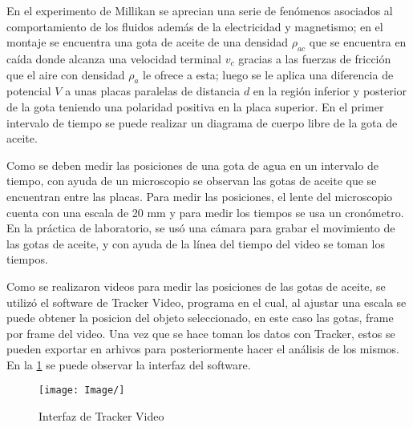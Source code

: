 En el experimento de Millikan se aprecian una serie de fenómenos asociados al 
comportamiento de los fluidos además de la electricidad y magnetismo; en el 
montaje se encuentra una gota de aceite de una densidad $\rho_{ac}$ que se 
encuentra en caída donde alcanza una velocidad terminal $v_c$ gracias a las 
fuerzas de fricción que el aire con densidad $\rho_a$ le ofrece a esta; luego 
se le aplica una diferencia de potencial $V$ a unas placas paralelas de 
distancia $d$ en la región inferior y posterior de la gota teniendo una 
polaridad positiva en la placa superior. En el primer intervalo de tiempo se 
puede realizar un diagrama de cuerpo libre de la gota de aceite.



Como se deben medir las posiciones de una gota de agua en un intervalo de 
tiempo, con ayuda de un microscopio se observan las gotas de aceite que se 
encuentran entre las placas. Para medir las posiciones, el lente del
microscopio cuenta con una escala de 20 mm y para medir los tiempos se usa un
cronómetro. En la práctica de laboratorio, se usó una cámara para grabar el 
movimiento de las gotas de aceite, y con ayuda de la línea del tiempo del video
se toman los tiempos.



Como se realizaron videos para medir las posiciones de las gotas de aceite, se 
utilizó el software de Tracker Video, programa en el cual, al ajustar una
escala se puede obtener la posicion del objeto seleccionado, en este caso las 
gotas, frame por frame del video. Una vez que se hace toman los datos con 
Tracker, estos se pueden exportar en arhivos para posteriormente hacer el 
análisis de los mismos. En la \cref{fig:Tracker} se puede observar la interfaz
del software.

\begin{figure}[H]
    \centering
    \texttt{[image: Image/]}
    \caption{Interfaz de Tracker Video}
    \label{fig:Tracker}
\end{figure}
